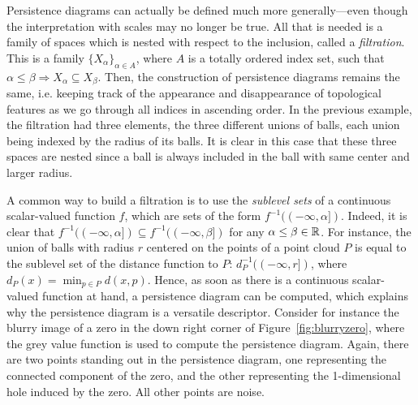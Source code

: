Persistence diagrams can actually be defined much more generally---even though
 the interpretation with scales may no longer be true.
All that is needed is a family of spaces which is nested with respect to the inclusion, called a {\em filtration}. 
This is a family $\{X_\alpha\}_{\alpha\in A}$, where 
$A$ is a totally ordered index set, such that $\alpha\leq\beta\Rightarrow X_\alpha\subseteq X_\beta$.
Then, the construction of persistence diagrams remains the same, i.e. keeping track of the appearance and disappearance of topological features
as we go through all indices in ascending order.
In the previous example, the filtration had three elements,
the three different unions of balls, each union being indexed by the radius of its balls.
It is clear in this case that these three spaces are nested since a ball
is always included in the ball with same center and larger radius.

A common way to build a filtration is to use the {\em sublevel sets} of a continuous scalar-valued function $f$, which are sets of the form
$f^{-1}((-\infty,\alpha])$. Indeed, it is clear that $f^{-1}((-\infty,\alpha])\subseteq f^{-1}((-\infty,\beta])$ for any $\alpha\leq\beta\in\mathbb{R}$. 
For instance, the union of balls with radius $r$ centered on the points of a point cloud $P$
is equal to the sublevel set of the distance function to  $P$: $d_P^{-1}((-\infty,r])$, where $d_P(x)=\min_{p\in P}d(x,p)$.
Hence, as soon as there is a continuous scalar-valued function at hand, a persistence diagram can be computed, which explains
why the persistence diagram is a versatile descriptor. %
Consider for instance the blurry image of a zero in the down right corner of Figure~\ref{fig:blurryzero}, where
the grey value function is used to compute the persistence diagram. Again, there are two points standing out
in the persistence diagram, one representing the connected component of the zero, and the other representing 
the 1-dimensional hole induced by the zero. All other points are noise. 


